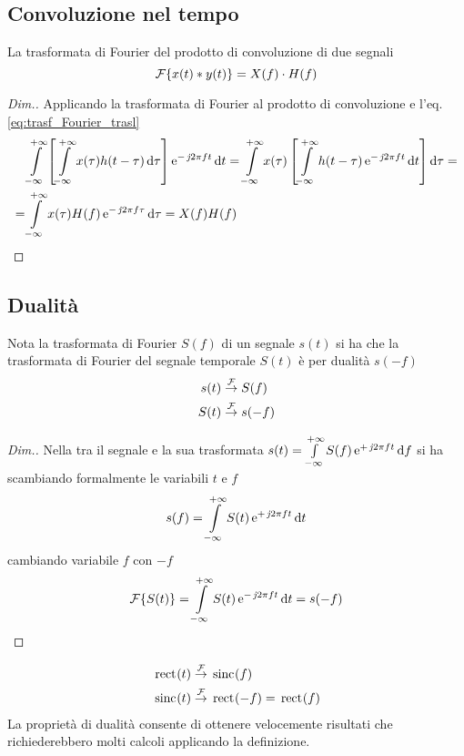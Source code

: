 \subsection{Convoluzione nel tempo}
La trasformata di Fourier del prodotto di convoluzione di due segnali
\begin{equation}
\operatorname{\mathcal{F}}\!\left\lbrace{x(t)\ast y(t)}\right\rbrace=X(f)\cdot H(f)
\label{eq:trasf_Fourier_conv}
\end{equation}
\begin{proof}[Dim.] Applicando la trasformata di Fourier al prodotto di convoluzione e l'eq.\ref{eq:trasf_Fourier_trasl}
\[\begin{split}& \intinf{ \left[\intinf{x(\tau)h(t-\tau)}{\tau}\right] \e{-\imath 2\pi f t}}{t} =
\intinf{ x(\tau) \left[\intinf{h(t-\tau)\e{-\imath 2\pi f t}}{t}\right]}{\tau}=\\
=& \intinf{ x(\tau) H(f)\e{-\imath 2\pi f \tau}}{\tau} = X(f) H(f) \end{split}\]
\end{proof}

\subsection{Dualità}
Nota la trasformata di Fourier $S(f)$ di un segnale $s(t)$ si ha che la trasformata di Fourier del segnale temporale $S(t)$ è per dualità $s(-f)$
\begin{equation}
\begin{split}
s(t) &\overset{\operatorname{\mathcal{F}}}{\to} S(f) \\
S(t) &\overset{\operatorname{\mathcal{F}}}{\to} s(-f)
\end{split}
\end{equation}
\begin{proof}[Dim.]
Nella tra il segnale e la sua trasformata $s(t)=\int\limits_{-\infty}^{+\infty}{S(f)\operatorname{e}^{+\operatorname{\mathit{j}\!} 2\pi f t}}{\,\mathop{}\!\mathrm{d}{f}}$
si ha scambiando formalmente le variabili $t$ e $f$ \[s(f)=\int\limits_{-\infty}^{+\infty}{S(t)\operatorname{e}^{+\operatorname{\mathit{j}\!} 2\pi f t}}{\,\mathop{}\!\mathrm{d}{t}}\]
cambiando variabile $f$ con $-f$
\[\operatorname{\mathcal{F}}\!\left\lbrace{S(t)}\right\rbrace=\int\limits_{-\infty}^{+\infty}{S(t)\operatorname{e}^{-\operatorname{\mathit{j}\!} 2\pi f t}}{\,\mathop{}\!\mathrm{d}{t}}=s(-f)\]
\end{proof}

\begin{esempio}
\begin{equation}
\begin{split}
\,{\operatorname{rect}}^{}\!\left({t}\right) &\overset{\operatorname{\mathcal{F}}}{\to} \,{\operatorname{sinc}}^{}\!\left({f}\right)\\
\,{\operatorname{sinc}}^{}\!\left({t}\right) &\overset{\operatorname{\mathcal{F}}}{\to} \,{\operatorname{rect}}^{}\!\left({-f}\right)=\,{\operatorname{rect}}^{}\!\left({f}\right)
\end{split}
\end{equation}
La proprietà di dualità consente di ottenere velocemente risultati che richiederebbero molti calcoli applicando la definizione.
\end{esempio}

